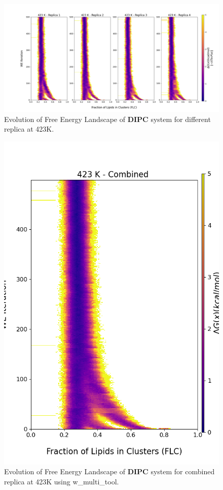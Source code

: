 \documentclass{biophys-new}
\begin{document}
\begin{figure}[hbt!]
\centering
\includegraphics[width=1.1\linewidth]{all_plots/ClusterLipids2Total/DPPC_DIPC_CHOL/423K/Evolution_DIPC_423_ClusterLipids2Total.png}
\caption{Evolution of Free Energy Landscape of \textbf{DIPC} system for different replica at 423K.}
\label{fig:view}

\end{figure}

\begin{figure}[hbt!]
\centering
\includegraphics[width=0.8\linewidth]{all_plots/ClusterLipids2Total/DPPC_DIPC_CHOL/423K/Evolution_DIPC_MULTI__423_ClusterLipids2Total.png}
\caption{Evolution of Free Energy Landscape of \textbf{DIPC} system for combined replica at 423K using w\_multi\_tool.}
\label{fig:view}

\end{figure}
\end{document}
